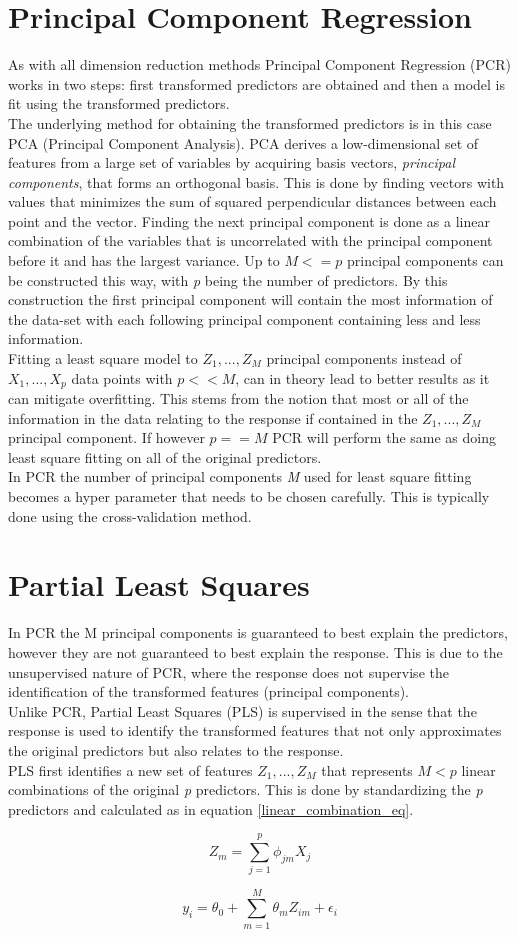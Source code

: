 \section{Principal Component Regression}
As with all dimension reduction methods Principal Component Regression (PCR) works in two steps: first transformed predictors are obtained and then a model is fit using the transformed predictors.\\
The underlying method for obtaining the transformed predictors is in this case PCA (Principal Component Analysis).
PCA derives a low-dimensional set of features from a large set of variables by acquiring basis vectors, \emph{principal components}, that forms an orthogonal basis. This is done by finding vectors with values that minimizes the sum of squared perpendicular distances between each point and the vector. Finding the next principal component is done as a linear combination of the variables that is uncorrelated with the principal component before it and has the largest variance. Up to \(M <= p\) principal components can be constructed this way, with \emph{p} being the number of predictors. By this construction the first principal component will contain the most information of the data-set with each following principal component containing less and less information.\\
Fitting a least square model to \(Z_1,...,Z_M\) principal components instead of \(X_1,...,X_p\) data points with \(p << M\), can in theory lead to better results as it can mitigate overfitting. This stems from the notion that most or all of the information in the data relating to the response if contained in the \(Z_1,...,Z_M\) principal component. If however \(p == M\) PCR will perform the same as doing least square fitting on all of the original predictors.\\
In PCR the number of principal components \emph{M} used for least square fitting becomes a hyper parameter that needs to be chosen carefully. This is typically done using the cross-validation method.


\section{Partial Least Squares}
In PCR the M principal components is guaranteed to best explain the predictors, however they are not guaranteed to best explain the response. This is due to the unsupervised nature of PCR, where the response does not supervise the identification of the transformed features (principal components).\\
Unlike PCR, Partial Least Squares (PLS) is supervised in the sense that the response is used to identify the transformed features that not only approximates the original predictors but also relates to the response.\\
PLS first identifies a new set of features \(Z_1,...,Z_M\) that represents \(M < p\) linear combinations of the original \emph{p} predictors. This is done by standardizing the \emph{p} predictors and calculated as in equation \ref{linear_combination_eq}.

\begin{equation}
Z_m = \sum_{j=1}^{p}\phi_{jm}X_j\label{linear_combination_eq}
\end{equation}

\begin{equation}
y_i = \theta_0 + \sum_{m=1}^{M}\theta_{m}Z_{im} + \epsilon_i\label{transformed_linear_regression_eq}
\end{equation}